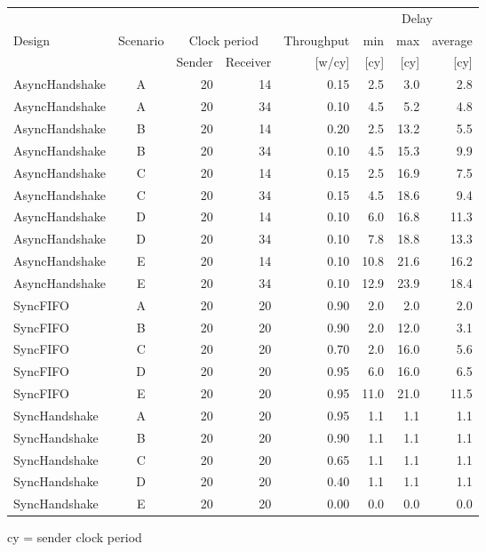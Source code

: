 % 
% 
\begin{tabular}{lc|*{6}{r}}
  & & & & & \multicolumn{3}{c}{Delay}\\
 Design & Scenario & \multicolumn{2}{c}{Clock period} & Throughput &  min & max & average \\
  & & Sender & Receiver & [w/cy] & [cy] & [cy] & [cy] \\
\hline
 AsyncHandshake & A &  20 & 14 & 0.15  & 2.5 & 3.0 & 2.8 \\[0ex]
 AsyncHandshake & A &  20 & 34 & 0.10  & 4.5 & 5.2 & 4.8 \\[0ex]
 AsyncHandshake & B &  20 & 14 & 0.20  & 2.5 & 13.2 & 5.5 \\[0ex]
 AsyncHandshake & B &  20 & 34 & 0.10  & 4.5 & 15.3 & 9.9 \\[0ex]
 AsyncHandshake & C &  20 & 14 & 0.15  & 2.5 & 16.9 & 7.5 \\[0ex]
 AsyncHandshake & C &  20 & 34 & 0.15  & 4.5 & 18.6 & 9.4 \\[0ex]
 AsyncHandshake & D &  20 & 14 & 0.10  & 6.0 & 16.8 & 11.3 \\[0ex]
 AsyncHandshake & D &  20 & 34 & 0.10  & 7.8 & 18.8 & 13.3 \\[0ex]
 AsyncHandshake & E &  20 & 14 & 0.10  & 10.8 & 21.6 & 16.2 \\[0ex]
 AsyncHandshake & E &  20 & 34 & 0.10  & 12.9 & 23.9 & 18.4 \\[0ex]
\hline
 SyncFIFO & A &  20 & 20 & 0.90  & 2.0 & 2.0 & 2.0 \\[0ex]
 SyncFIFO & B &  20 & 20 & 0.90  & 2.0 & 12.0 & 3.1 \\[0ex]
 SyncFIFO & C &  20 & 20 & 0.70  & 2.0 & 16.0 & 5.6 \\[0ex]
 SyncFIFO & D &  20 & 20 & 0.95  & 6.0 & 16.0 & 6.5 \\[0ex]
 SyncFIFO & E &  20 & 20 & 0.95  & 11.0 & 21.0 & 11.5 \\[0ex]
\hline
 SyncHandshake & A &  20 & 20 & 0.95  & 1.1 & 1.1 & 1.1 \\[0ex]
 SyncHandshake & B &  20 & 20 & 0.90  & 1.1 & 1.1 & 1.1 \\[0ex]
 SyncHandshake & C &  20 & 20 & 0.65  & 1.1 & 1.1 & 1.1 \\[0ex]
 SyncHandshake & D &  20 & 20 & 0.40  & 1.1 & 1.1 & 1.1 \\[0ex]
 SyncHandshake & E &  20 & 20 & 0.00  & 0.0 & 0.0 & 0.0 \\[0ex]
\hline
\end{tabular}
 
cy = sender clock period
 
